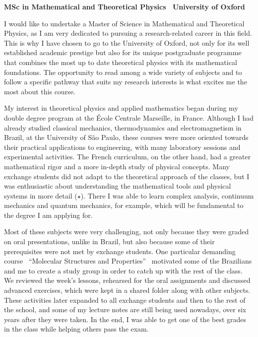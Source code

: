 \documentclass[11pt]{article}
\newcommand*{\NEWLINE}{\vspace{0.75em}}
\begin{document}
\sffamily %

{\bfseries MSc in Mathematical and Theoretical Physics \textemdash~University of Oxford}
\NEWLINE{}\NEWLINE{}

I would like to undertake a Master of Science in Mathematical and Theoretical Physics, as I am very dedicated to pursuing a research-related career in this field. This is why I have chosen to go to the University of Oxford, not only for its well established academic prestige but also for its unique postgraduate programme that combines the most up to date theoretical physics with its mathematical foundations. The opportunity to read among a wide variety of subjects and to follow a specific pathway that suits my research interests is what excites me the most about this course. \NEWLINE{}

My interest in theoretical physics and applied mathematics began during my double degree program at the École Centrale Marseille, in France. Although I had already studied classical mechanics, thermodynamics and electromagnetism in Brazil, at the University of São Paulo, these courses were more oriented towards their practical applications to engineering, with many laboratory sessions and experimental activities. The French curriculum, on the other hand, had a greater mathematical rigor and a more in-depth study of physical concepts. Many exchange students did not adapt to the theoretical approach of the classes, but I was enthusiastic about understanding the mathematical tools and physical systems in more detail ($\star$). There I was able to learn complex analysis, continuum mechanics and quantum mechanics, for example, which will be fundamental to the degree I am applying for. \NEWLINE{}

Most of these subjects were very challenging, not only because they were graded on oral presentations, unlike in Brazil, but also because some of their prerequisites were not met by exchange students. One particular demanding course \textemdash~``Molecular Structures and Properties'' \textemdash~motivated some of the Brazilians and me to create a study group in order to catch up with the rest of the class. We reviewed the week's lessons, rehearsed for the oral assignments and discussed advanced exercises, which were kept in a shared folder along with other subjects. These activities later expanded to all exchange students and then to the rest of the school, and some of my lecture notes are still being used nowadays, over six years after they were taken. In the end, I was able to get one of the best grades in the class while helping others pass the exam. \NEWLINE{}
\end{document}

